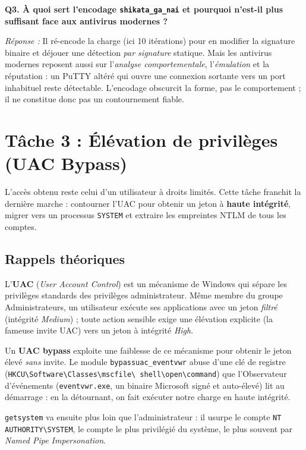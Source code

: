 \documentclass[11pt,a4paper]{article}
\begin{document}
\medskip\noindent\textbf{Q3. À quoi sert l'encodage \texttt{shikata\_ga\_nai} et pourquoi n'est-il plus suffisant face aux antivirus modernes ?}

\textit{Réponse :} Il ré-encode la charge (ici 10 itérations) pour en modifier la signature
binaire et déjouer une détection \emph{par signature} statique. Mais les antivirus modernes
reposent aussi sur l'\emph{analyse comportementale}, l'\emph{émulation} et la réputation :
un PuTTY altéré qui ouvre une connexion sortante vers un port inhabituel reste détectable.
L'encodage obscurcit la forme, pas le comportement ; il ne constitue donc pas un contournement
fiable.

\section{Tâche 3 : Élévation de privilèges (UAC Bypass)}
L'accès obtenu reste celui d'un utilisateur à droits limités. Cette tâche franchit la dernière
marche : contourner l'UAC pour obtenir un jeton à \textbf{haute intégrité}, migrer vers un
processus \texttt{SYSTEM} et extraire les empreintes NTLM de tous les comptes.

\subsection{Rappels théoriques}
L'\textbf{UAC} (\emph{User Account Control}) est un mécanisme de Windows qui sépare les
privilèges standards des privilèges administrateur. Même membre du groupe Administrateurs, un
utilisateur exécute ses applications avec un jeton \emph{filtré} (intégrité \emph{Medium}) ;
toute action sensible exige une élévation explicite (la fameuse invite UAC) vers un jeton à
intégrité \emph{High}.

Un \textbf{UAC bypass} exploite une faiblesse de ce mécanisme pour obtenir le jeton élevé
\emph{sans} invite. Le module \texttt{bypassuac\_eventvwr} abuse d'une clé de registre
(\texttt{HKCU\textbackslash Software\textbackslash Classes\textbackslash mscfile\textbackslash
shell\textbackslash open\textbackslash command}) que l'Observateur d'événements
(\texttt{eventvwr.exe}, un binaire Microsoft signé et auto-élevé) lit au démarrage : en la
détournant, on fait exécuter notre charge en haute intégrité.

\texttt{getsystem} va ensuite plus loin que l'administrateur : il usurpe le compte
\texttt{NT AUTHORITY\textbackslash SYSTEM}, le compte le plus privilégié du système, le plus
souvent par \emph{Named Pipe Impersonation}.
\end{document}
